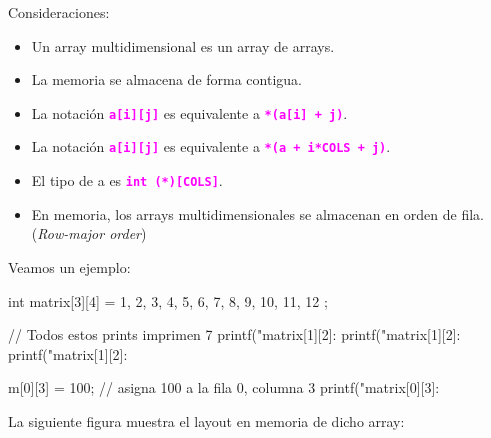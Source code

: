 \documentclass[]{scrartcl}
\newcommand{\hl}[1]{\textcolor{magenta}{\textbf{\texttt{#1}}}}
\begin{document}
Consideraciones:
\begin{itemize}
  \item Un array multidimensional es un array de arrays.
  \item La memoria se almacena de forma contigua.
  \item La notación \hl{a[i][j]} es equivalente a \hl{*(a[i] + j)}.
  \item La notación \hl{a[i][j]} es equivalente a \hl{*(a + i*COLS + j)}.
  \item El tipo de a es \hl{int (*)[COLS]}.
  \item En memoria, los arrays multidimensionales se almacenan en orden de fila. (\textit{Row-major order})
\end{itemize}

Veamos un ejemplo:

\begin{cbox}[]{}
  int matrix[3][4] = {
    {1, 2, 3, 4},
    {5, 6, 7, 8},
    {9, 10, 11, 12}
  };

  // Todos estos prints imprimen 7
  printf("matrix[1][2]: %
  printf("matrix[1][2]: %
  printf("matrix[1][2]: %

  m[0][3] = 100; // asigna 100 a la fila 0, columna 3
  printf("matrix[0][3]: %
\end{cbox}  

La siguiente figura muestra el layout en memoria de dicho array:

\begin{center}
  \noindent {}
  \label{fig:matrix}
\end{center}
\end{document}
